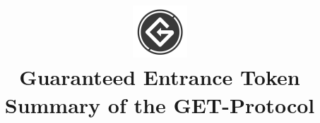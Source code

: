 \documentclass[letterpaper,10pt]{article}
\begin{document}
\title{ %
\vspace{-2cm}
\includegraphics{1} \\
Guaranteed Entrance Token \\
\small Summary of the GET-Protocol}
\date{}

\maketitle
\vspace{-1.5cm}
\end{document}
